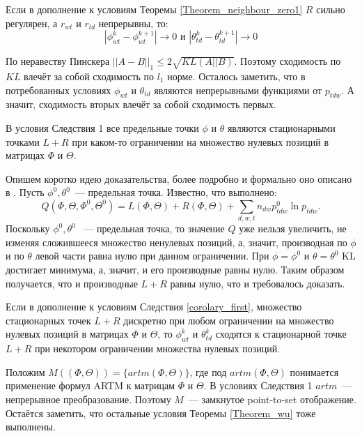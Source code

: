 \documentclass[12pt, twoside]{article}
\begin{document}
\begin{Corollary}
\label{corolary_first}
Если в дополнение к условиям Теоремы \ref{Theorem_neighbour_zero1} $R$ сильно регулярен, а $r_{wt}$ и $r_{td}$ непрерывны, то:
\[
|\phi_{wt}^{k} - \phi_{wt}^{k+1}| \to 0 \text{ и } |\theta_{td}^{k} - \theta_{td}^{k+1}| \to 0
\]
\end{Corollary}
\begin{Proof}
По неравеству Пинскера \cite{topsoe2000some} $||A - B||_1 \leq 2\sqrt{KL(A||B)}$. Поэтому сходимость по $KL$ влечёт за собой сходимость по $l_1$ норме. Осталось заметить, что в потребованных условиях  $\phi_{wt}$ и $\theta_{td}$ являются непрерывными функциями от $p_{tdw}$. А значит, сходимость вторых влечёт за собой сходимость первых.
\end{Proof}
\begin{Corollary}
В условия Следствия 1 все предельные точки $\phi$ и $\theta$ являются стационарными точками $L +  R$ при каком-то ограничении на множество нулевых позиций в матрицах $\Phi$ и $\Theta$.
\end{Corollary}
\begin{Proof}
Опишем коротко идею доказательства,  более подробно и формально оно описано в \cite{wu1983convergence}. Пусть  $\phi^0, \theta^0$~--- предельная точка. Известно, что выполнено:
\[
Q(\Phi, \Theta, \Phi^0, \Theta^0) =  L(\Phi, \Theta) +  R(\Phi, \Theta) + \sum\limits_{d, w, t} n_{dw} p^0_{tdw} \ln{p_{tdw}}.
\]
Поскольку $\phi^0, \theta^0$ ~--- предельная точка, то значение $Q$ уже нельзя увеличить, не изменяя сложившееся множество ненулевых позиций, а, значит, производная по $\phi$ и по $\theta$ левой части равна нулю при данном ограничении. При $\phi = \phi^0$ и $\theta = \theta^0$ KL достигает минимума, а, значит, и его производные равны нулю. Таким образом получается, что и производные $L +  R$ равны нулю, что и требовалось доказать.
\end{Proof}
\begin{Corollary}
Если в дополнение к условиям Следствия \ref{corolary_first}, множество стационарных точек $L +  R$ дискретно при любом  ограничении на множество нулевых позиций в матрицах $\Phi$ и $\Theta$, то $\phi_{wt}^{k}$ и $\theta_{td}^{k}$ сходятся к стационарной точке $L +  R$ при некотором ограничении множества нулевых позиций.
\end{Corollary}
\begin{Proof}
Положим $M((\Phi, \Theta)) = \{artm(\Phi, \Theta)\}$, где под $artm(\Phi, \Theta)$ понимается применение формул ARTM к матрицам $\Phi$ и $\Theta$. В условиях Следствия 1 $artm$~--- непрерывное преобразование. Поэтому $M$~--- замкнутое point-to-set отображение. Остаётся заметить, что остальные условия Теоремы \ref{Theorem_wu} тоже выполнены.
\end{Proof}
\end{document}
